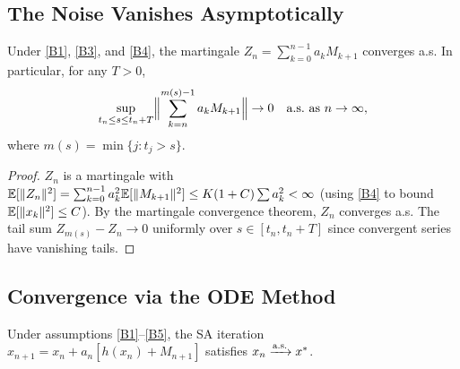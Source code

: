 \documentclass[11pt,a4paper]{article}
\begin{document}
\subsection{The Noise Vanishes Asymptotically}

\begin{lemma}
\label{lem:noise-vanishes}
Under \ref{B1}, \ref{B3}, and \ref{B4}, the martingale
$Z_n = \sum_{k=0}^{n-1} a_k M_{k+1}$ converges a.s. In particular,
for any $T > 0$,
\[
  \sup_{t_n \leq s \leq t_n + T}
    \Bigl\|\sum_{k=n}^{m(s)-1} a_k M_{k+1}\Bigr\|
    \to 0 \quad \text{a.s.\ as } n \to \infty,
\]
where $m(s) = \min\{j : t_j > s\}$.
\end{lemma}

\begin{proof}
$Z_n$ is a martingale with
$\mathbb{E}[\|Z_n\|^2] = \sum_{k=0}^{n-1} a_k^2 \mathbb{E}[\|M_{k+1}\|^2]
\leq K(1+C)\sum a_k^2 < \infty$
(using \ref{B4} to bound $\mathbb{E}[\|x_k\|^2] \leq C$). By the martingale
convergence theorem, $Z_n$ converges a.s. The tail sum
$Z_{m(s)} - Z_n \to 0$ uniformly over $s \in [t_n, t_n+T]$ since
convergent series have vanishing tails.
\end{proof}

\subsection{Convergence via the ODE Method}

\begin{theorem}
\label{thm:ode-convergence}
Under assumptions \ref{B1}--\ref{B5}, the SA iteration
$x_{n+1} = x_n + a_n[h(x_n) + M_{n+1}]$ satisfies
$x_n \xrightarrow{\text{a.s.}} x^*$.
\end{theorem}
\end{document}
